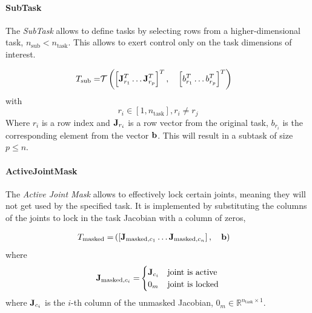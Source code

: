 \paragraph{SubTask}
The \emph{SubTask} allows to define tasks by selecting rows from a higher-dimensional task, $n_\text{sub}<n_\text{task}$. This allows to exert control only on the task dimensions of interest.

\begin{eqnarray}
T_\text{sub} = & \mathcal{T} \left( \left[ \mathbf{J}_{r_1}^T \dotsc \mathbf{J}_{r_p}^T \right]^T, \quad \left[ b_{r_1}^T \dotsc b_{r_p}^T \right]^T \right)
\end{eqnarray}
with
\begin{equation*}
r_i \in \left[1, n_\text{task} \right], r_i \neq r_j 
\end{equation*}
Where $r_i$ is a row index and $\mathbf{J}_{r_i}$ is a row vector from the original task, $b_{r_i}$ is the corresponding element from the vector $\mathbf{b}$.
This will result in a subtask of size $p \leq n$.

\paragraph{ActiveJointMask}
The \emph{Active Joint Mask} allows to effectively lock certain joints, meaning they will not get used by the specified task. It is implemented by substituting the columns of the joints to lock in the task Jacobian with a column of zeros, 

\begin{eqnarray}
T_\text{masked} = & \left( \left[ \mathbf{J}_{\text{masked},c_1} \dotsc \mathbf{J}_{\text{masked},c_n} \right], \quad \mathbf{b} \right)
\end{eqnarray}
where
\begin{equation*}
{\mathbf{J}_{\text{masked},c_i}=}
\begin{cases}
\mathbf{J}_{c_i} & \text{joint is active}\\
0_m & \text{joint is locked}
\end{cases}
\end{equation*}
 where $\mathbf{J}_{c_i}$ is the $i$-th column of the unmasked Jacobian, $0_m \in \mathbb{R}^{n_\text{task} \times 1}$.


